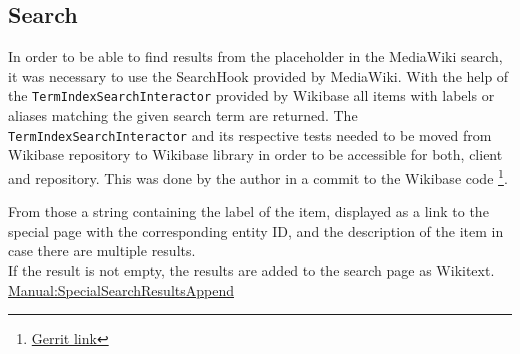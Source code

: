 \subsection{Search}
In order to be able to find results from the placeholder in the MediaWiki search, it was necessary to use the SearchHook provided by MediaWiki.
With the help of the \texttt{TermIndexSearchInteractor} provided by Wikibase all items with labels or aliases matching the given search term are returned. The \texttt{TermIndexSearchInteractor} and its respective tests needed to be moved from Wikibase repository to Wikibase library in order to be accessible for both, client and repository. This was done by the author in a commit to the Wikibase code \footnote{\href{https://gerrit.wikimedia.org/r/\#/c/243723/}{Gerrit link}}.

From those a string containing the label of the item, displayed as a link to the special page with the corresponding entity ID, and the description of the item in case there are multiple results.  \\
If the result is not empty, the results are added to the search page as Wikitext. \\
\href{https://www.mediawiki.org/wiki/Manual:Hooks/SpecialSearchResultsAppend}{Manual:SpecialSearchResultsAppend}